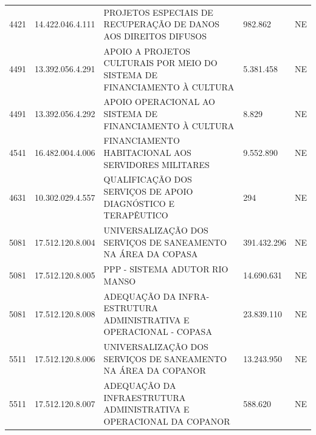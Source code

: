 \documentclass{article}
\begin{document}
\begin{longtable}[c]{m{1cm}|m{2cm}|m{10cm}|m{2cm}|m{1cm}}
\multicolumn{1}{C{1cm}|}{4421} & \multicolumn{1}{C{2cm}|}{14.422.046.4.111} & \multicolumn{1}{L{10cm}|}{PROJETOS ESPECIAIS DE RECUPERAÇÃO DE DANOS AOS DIREITOS DIFUSOS} & \multicolumn{1}{R{2cm}|}{982.862} & \multicolumn{1}{C{1cm}}{NE} \\
\multicolumn{1}{C{1cm}|}{4491} & \multicolumn{1}{C{2cm}|}{13.392.056.4.291} & \multicolumn{1}{L{10cm}|}{APOIO A PROJETOS CULTURAIS POR MEIO DO SISTEMA DE FINANCIAMENTO À CULTURA} & \multicolumn{1}{R{2cm}|}{5.381.458} & \multicolumn{1}{C{1cm}}{NE} \\
\multicolumn{1}{C{1cm}|}{4491} & \multicolumn{1}{C{2cm}|}{13.392.056.4.292} & \multicolumn{1}{L{10cm}|}{APOIO OPERACIONAL AO SISTEMA DE FINANCIAMENTO À CULTURA} & \multicolumn{1}{R{2cm}|}{8.829} & \multicolumn{1}{C{1cm}}{NE} \\
\multicolumn{1}{C{1cm}|}{4541} & \multicolumn{1}{C{2cm}|}{16.482.004.4.006} & \multicolumn{1}{L{10cm}|}{FINANCIAMENTO HABITACIONAL AOS SERVIDORES MILITARES} & \multicolumn{1}{R{2cm}|}{9.552.890} & \multicolumn{1}{C{1cm}}{NE} \\
\multicolumn{1}{C{1cm}|}{4631} & \multicolumn{1}{C{2cm}|}{10.302.029.4.557} & \multicolumn{1}{L{10cm}|}{QUALIFICAÇÃO DOS SERVIÇOS DE APOIO DIAGNÓSTICO E TERAPÊUTICO} & \multicolumn{1}{R{2cm}|}{294} & \multicolumn{1}{C{1cm}}{NE} \\
\multicolumn{1}{C{1cm}|}{5081} & \multicolumn{1}{C{2cm}|}{17.512.120.8.004} & \multicolumn{1}{L{10cm}|}{UNIVERSALIZAÇÃO DOS SERVIÇOS DE SANEAMENTO NA ÁREA DA COPASA} & \multicolumn{1}{R{2cm}|}{391.432.296} & \multicolumn{1}{C{1cm}}{NE} \\
\multicolumn{1}{C{1cm}|}{5081} & \multicolumn{1}{C{2cm}|}{17.512.120.8.005} & \multicolumn{1}{L{10cm}|}{PPP - SISTEMA ADUTOR RIO MANSO} & \multicolumn{1}{R{2cm}|}{14.690.631} & \multicolumn{1}{C{1cm}}{NE} \\
\multicolumn{1}{C{1cm}|}{5081} & \multicolumn{1}{C{2cm}|}{17.512.120.8.008} & \multicolumn{1}{L{10cm}|}{ADEQUAÇÃO DA INFRA-ESTRUTURA ADMINISTRATIVA E OPERACIONAL - COPASA} & \multicolumn{1}{R{2cm}|}{23.839.110} & \multicolumn{1}{C{1cm}}{NE} \\
\multicolumn{1}{C{1cm}|}{5511} & \multicolumn{1}{C{2cm}|}{17.512.120.8.006} & \multicolumn{1}{L{10cm}|}{UNIVERSALIZAÇÃO DOS SERVIÇOS DE SANEAMENTO NA ÁREA DA COPANOR} & \multicolumn{1}{R{2cm}|}{13.243.950} & \multicolumn{1}{C{1cm}}{NE} \\
\multicolumn{1}{C{1cm}|}{5511} & \multicolumn{1}{C{2cm}|}{17.512.120.8.007} & \multicolumn{1}{L{10cm}|}{ADEQUAÇÃO DA INFRAESTRUTURA ADMINISTRATIVA E OPERACIONAL DA COPANOR} & \multicolumn{1}{R{2cm}|}{588.620} & \multicolumn{1}{C{1cm}}{NE} \\

\end{longtable}
\end{document}
